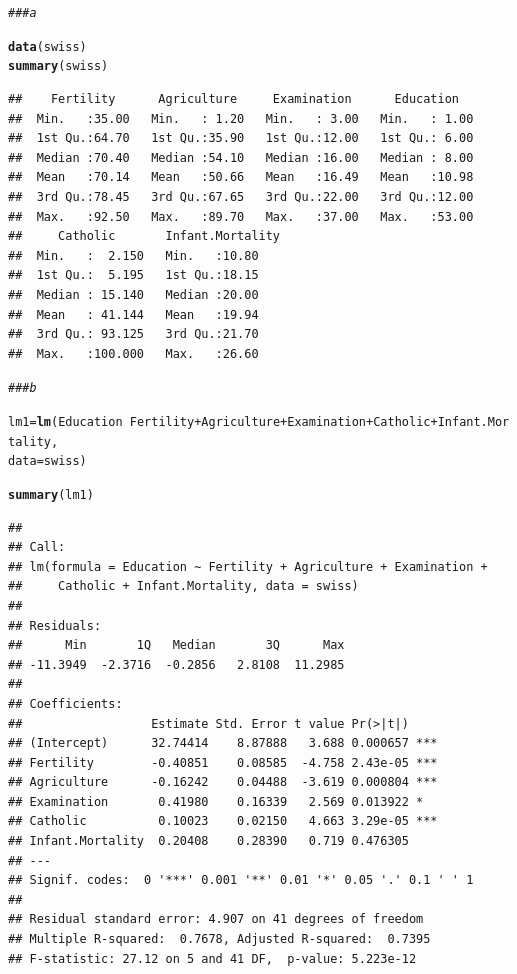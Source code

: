\documentclass[12pt,letter]{article}\usepackage[]{graphicx}\usepackage[]{color}
\makeatletter
\newcommand{\hlcom}[1]{\textcolor[rgb]{0.678,0.584,0.686}{\textit{#1}}}%
\newcommand{\hlopt}[1]{\textcolor[rgb]{0,0,0}{#1}}%
\newcommand{\hlstd}[1]{\textcolor[rgb]{0.345,0.345,0.345}{#1}}%
\newcommand{\hlkwb}[1]{\textcolor[rgb]{0.69,0.353,0.396}{#1}}%
\newcommand{\hlkwc}[1]{\textcolor[rgb]{0.333,0.667,0.333}{#1}}%
\newcommand{\hlkwd}[1]{\textcolor[rgb]{0.737,0.353,0.396}{\textbf{#1}}}%
\newenvironment{kframe}{%
 \def\at@end@of@kframe{}%
 \ifinner\ifhmode%
  \def\at@end@of@kframe{\end{minipage}}%
  \begin{minipage}{\columnwidth}%
 \fi\fi%
 \def\FrameCommand##1{\hskip\@totalleftmargin \hskip-\fboxsep
 \colorbox{shadecolor}{##1}\hskip-\fboxsep
     \hskip-\linewidth \hskip-\@totalleftmargin \hskip\columnwidth}%
 \MakeFramed {\advance\hsize-\width
   \@totalleftmargin\z@ \linewidth\hsize
   \@setminipage}}%
 {\par\unskip\endMakeFramed%
 \at@end@of@kframe}
\newenvironment{knitrout}{}{} %
\makeatother
\begin{document}
\begin{knitrout}
\color{fgcolor}\begin{kframe}
\begin{alltt}
\hlcom{### a}

\hlkwd{data}\hlstd{(swiss)}
\hlkwd{summary}\hlstd{(swiss)}
\end{alltt}
\begin{verbatim}
##    Fertility      Agriculture     Examination      Education    
##  Min.   :35.00   Min.   : 1.20   Min.   : 3.00   Min.   : 1.00  
##  1st Qu.:64.70   1st Qu.:35.90   1st Qu.:12.00   1st Qu.: 6.00  
##  Median :70.40   Median :54.10   Median :16.00   Median : 8.00  
##  Mean   :70.14   Mean   :50.66   Mean   :16.49   Mean   :10.98  
##  3rd Qu.:78.45   3rd Qu.:67.65   3rd Qu.:22.00   3rd Qu.:12.00  
##  Max.   :92.50   Max.   :89.70   Max.   :37.00   Max.   :53.00  
##     Catholic       Infant.Mortality
##  Min.   :  2.150   Min.   :10.80   
##  1st Qu.:  5.195   1st Qu.:18.15   
##  Median : 15.140   Median :20.00   
##  Mean   : 41.144   Mean   :19.94   
##  3rd Qu.: 93.125   3rd Qu.:21.70   
##  Max.   :100.000   Max.   :26.60
\end{verbatim}
\begin{alltt}
\hlcom{### b}

\hlstd{lm1} \hlkwb{=} \hlkwd{lm}\hlstd{(Education} \hlopt{~} \hlstd{Fertility} \hlopt{+} \hlstd{Agriculture} \hlopt{+} \hlstd{Examination} \hlopt{+} \hlstd{Catholic} \hlopt{+} \hlstd{Infant.Mortality,}
    \hlkwc{data} \hlstd{= swiss)}

\hlkwd{summary}\hlstd{(lm1)}
\end{alltt}
\begin{verbatim}
## 
## Call:
## lm(formula = Education ~ Fertility + Agriculture + Examination + 
##     Catholic + Infant.Mortality, data = swiss)
## 
## Residuals:
##      Min       1Q   Median       3Q      Max 
## -11.3949  -2.3716  -0.2856   2.8108  11.2985 
## 
## Coefficients:
##                  Estimate Std. Error t value Pr(>|t|)    
## (Intercept)      32.74414    8.87888   3.688 0.000657 ***
## Fertility        -0.40851    0.08585  -4.758 2.43e-05 ***
## Agriculture      -0.16242    0.04488  -3.619 0.000804 ***
## Examination       0.41980    0.16339   2.569 0.013922 *  
## Catholic          0.10023    0.02150   4.663 3.29e-05 ***
## Infant.Mortality  0.20408    0.28390   0.719 0.476305    
## ---
## Signif. codes:  0 '***' 0.001 '**' 0.01 '*' 0.05 '.' 0.1 ' ' 1
## 
## Residual standard error: 4.907 on 41 degrees of freedom
## Multiple R-squared:  0.7678,	Adjusted R-squared:  0.7395 
## F-statistic: 27.12 on 5 and 41 DF,  p-value: 5.223e-12
\end{verbatim}
\end{kframe}
\end{knitrout}
\end{document}
